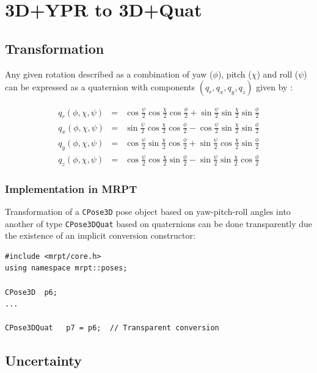 \documentclass[a4paper,10pt]{report}
\begin{document}
\section{3D+YPR to 3D+Quat }
\label{sect:ypr2quat}

\subsection{Transformation}

Any given rotation described as a combination of yaw ($\phi$),
pitch ($\chi$) and roll ($\psi$) can
be expressed as a quaternion with components $(q_r, q_x,q_y,q_z)$ 
given by \cite{horn2001some}:

\begin{eqnarray}
  q_r(\phi,\chi,\psi) &=& \cos\frac{\psi}{2} \cos\frac{\chi}{2}  \cos\frac{\phi}{2}  + 
  \sin\frac{\psi}{2} \sin\frac{\chi}{2} \sin\frac{\phi}{2}    \\
  q_x(\phi,\chi,\psi) &=& \sin\frac{\psi}{2} \cos\frac{\chi}{2}  \cos\frac{\phi}{2}  - 
  \cos\frac{\psi}{2} \sin\frac{\chi}{2} \sin\frac{\phi}{2}    \\
  q_y(\phi,\chi,\psi) &=& \cos\frac{\psi}{2} \sin\frac{\chi}{2}  \cos\frac{\phi}{2}  + 
  \sin\frac{\psi}{2} \cos\frac{\chi}{2} \sin\frac{\phi}{2}    \\
  q_z(\phi,\chi,\psi) &=& \cos\frac{\psi}{2} \cos\frac{\chi}{2}  \sin\frac{\phi}{2}  -
  \sin\frac{\psi}{2} \sin\frac{\chi}{2} \cos\frac{\phi}{2}   
\end{eqnarray}


\subsubsection{Implementation in MRPT}

Transformation of a \texttt{CPose3D} pose object based on yaw-pitch-roll angles 
into another of type \texttt{CPose3DQuat} based on quaternions can be done transparently 
due the existence of an implicit conversion constructor:

\begin{lstlisting}
#include <mrpt/core.h> 
using namespace mrpt::poses; 

CPose3D  p6;
...

CPose3DQuat   p7 = p6;  // Transparent conversion
\end{lstlisting}


\subsection{Uncertainty}
\end{document}
